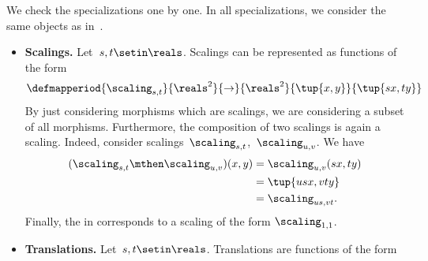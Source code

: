{\begin{solution}
    \begin{marginfigure}
        \begin{center}
        \end{center}
        \caption{Example of affine transformation with~$A=1.5\begin{bmatrix}
                    \cos(\pi/4) & \sin(\pi/4) \\-\sin(\pi/4)& \cos(\pi/4)
                \end{bmatrix}$.}
    \end{marginfigure}
    We check the specializations one by one.
    In all specializations, we consider the same objects as in~\Draw.
    \begin{itemize}
        \item \textbf{Scalings.}
              Let~$s,t\setin \reals$.
              Scalings can be represented as functions of the form
              \begin{equation}
                  \defmapperiod{
                      \scaling_{s,t}
                  }{
                      \reals^2
                  }{
                      \to
                  }{
                      \reals^2
                  }{
                      \tup{x,y}
                  }{
                      \tup{s x,t y}
                  }
              \end{equation}
              By just considering morphisms which are scalings, we are considering a subset of all morphisms.
              Furthermore, the composition of two scalings is again a scaling.
              Indeed, consider scalings~$\scaling_{s,t}$,~$\scaling_{u,v}$.
              We have
              \begin{equation}
                  \begin{aligned}
                      (\scaling_{s,t}\mthen \scaling_{u,v})(x,y)
                       & =\scaling_{u,v}(sx, ty) \\
                       & =\tup{usx, vty} \\
                       & =\scaling_{us,vt}.
                  \end{aligned}
              \end{equation}
              Finally, the  in \Draw corresponds to a scaling of the form $\scaling_{1,1}$.
        \item \textbf{Translations.}
              Let~$s,t\setin \reals$.
              Translations are functions of the form
              \begin{equation}

\end{equation}
\end{itemize}
\end{solution}}
